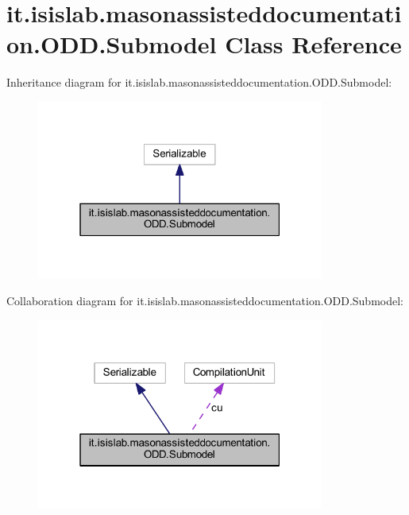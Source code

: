 \hypertarget{classit_1_1isislab_1_1masonassisteddocumentation_1_1_o_d_d_1_1_submodel}{\section{it.\-isislab.\-masonassisteddocumentation.\-O\-D\-D.\-Submodel Class Reference}
\label{classit_1_1isislab_1_1masonassisteddocumentation_1_1_o_d_d_1_1_submodel}
}


Inheritance diagram for it.\-isislab.\-masonassisteddocumentation.\-O\-D\-D.\-Submodel\-:\nopagebreak
\begin{figure}[H]
\begin{center}
\leavevmode
\includegraphics[width=268pt]{classit_1_1isislab_1_1masonassisteddocumentation_1_1_o_d_d_1_1_submodel__inherit__graph}
\end{center}
\end{figure}


Collaboration diagram for it.\-isislab.\-masonassisteddocumentation.\-O\-D\-D.\-Submodel\-:\nopagebreak
\begin{figure}[H]
\begin{center}
\leavevmode
\includegraphics[width=268pt]{classit_1_1isislab_1_1masonassisteddocumentation_1_1_o_d_d_1_1_submodel__coll__graph}
\end{center}
\end{figure}
